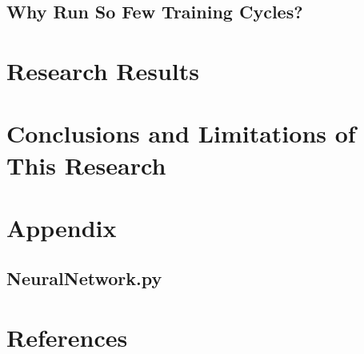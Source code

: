 \documentclass[12pt]{article}
\begin{document}
        

    \subsection{Why Run So Few Training Cycles?}

\section{Research Results \label{results}}

\section{Conclusions and Limitations of This Research \label{conclusions}}

\section{Appendix}

    \subsection{NeuralNetwork.py}

\section{References}

    \printbibliography[heading=none]
\end{document}
